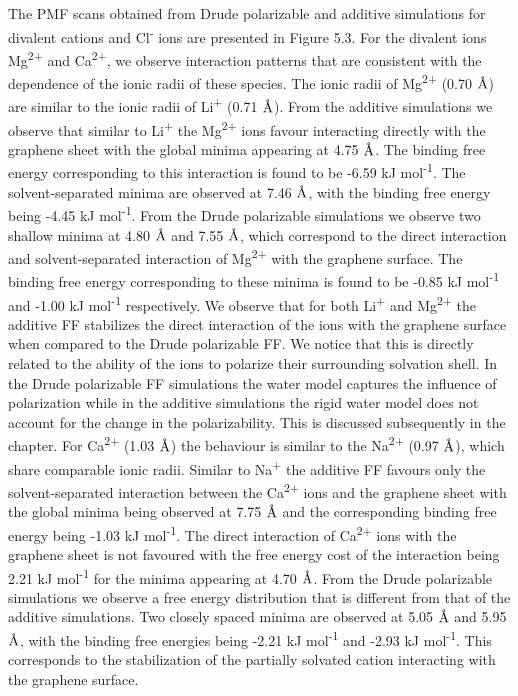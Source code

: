 The PMF scans obtained from Drude polarizable and additive simulations for divalent cations and Cl\textsuperscript{-} ions are presented in Figure 5.3. For the divalent ions Mg\textsuperscript{2+} and Ca\textsuperscript{2+}, we observe interaction patterns that are consistent with the dependence of the ionic radii of these species. The ionic radii of Mg\textsuperscript{2+} (0.70 $\text{\normalfont\AA}$) are similar to the ionic radii of Li\textsuperscript{+} (0.71 $\text{\normalfont\AA}$). From the additive simulations we observe that similar to Li\textsuperscript{+} the Mg\textsuperscript{2+} ions favour interacting directly with the graphene sheet with the global minima appearing at 4.75 $\text{\normalfont\AA}$. The binding free energy corresponding to this interaction is found to be -6.59 kJ mol\textsuperscript{-1}. The solvent-separated minima are observed at 7.46 $\text{\normalfont\AA}$, with the binding free energy being -4.45 kJ mol\textsuperscript{-1}. From the Drude polarizable simulations we observe two shallow minima at 4.80 $\text{\normalfont\AA}$ and 7.55 $\text{\normalfont\AA}$, which correspond to the direct interaction and solvent-separated interaction of Mg\textsuperscript{2+} with the graphene surface. The binding free energy corresponding to these minima is found to be -0.85 kJ mol\textsuperscript{-1} and -1.00 kJ mol\textsuperscript{-1} respectively. We observe that for both Li\textsuperscript{+} and Mg\textsuperscript{2+} the additive FF stabilizes the direct interaction of the ions with the graphene surface when compared to the Drude polarizable FF. We notice that this is directly related to the ability of the ions to polarize their surrounding solvation shell. In the Drude polarizable FF simulations the water model captures the influence of polarization while in the additive simulations the rigid water model does not account for the change in the polarizability. This is discussed subsequently in the chapter. For Ca\textsuperscript{2+} (1.03 $\text{\normalfont\AA}$) the behaviour is similar to the Na\textsuperscript{2+} (0.97 $\text{\normalfont\AA}$), which share comparable ionic radii. Similar to Na\textsuperscript{+} the additive FF favours only the solvent-separated interaction between the Ca\textsuperscript{2+} ions and the graphene sheet with the global minima being observed at 7.75 $\text{\normalfont\AA}$ and the corresponding binding free energy being -1.03 kJ mol\textsuperscript{-1}. The direct interaction of Ca\textsuperscript{2+} ions with the graphene sheet is not favoured with the free energy cost of the interaction being 2.21 kJ mol\textsuperscript{-1} for the minima appearing at 4.70 $\text{\normalfont\AA}$. From the Drude polarizable simulations we observe a free energy distribution that is different from that of the additive simulations. Two closely spaced minima are observed at 5.05 $\text{\normalfont\AA}$ and 5.95 $\text{\normalfont\AA}$, with the binding free energies being -2.21 kJ mol\textsuperscript{-1} and -2.93 kJ mol\textsuperscript{-1}. This corresponds to the stabilization of the partially solvated cation interacting with the graphene surface. 

